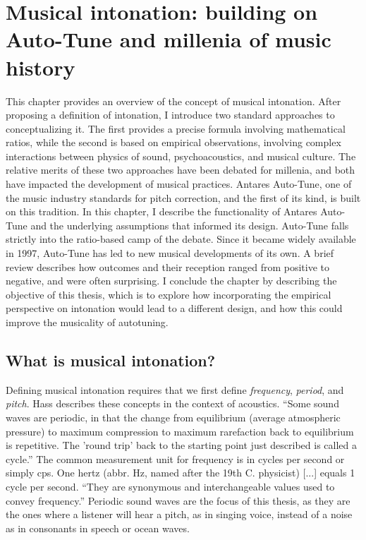 \chapter{Musical intonation: building on Auto-Tune and millenia of music history}
\label{chap:intonation}

This chapter provides an overview of the concept of musical intonation. After proposing a definition of intonation, I introduce two standard approaches to conceptualizing it. The first provides a precise formula involving mathematical ratios, while the second is based on empirical observations, involving complex interactions between physics of sound, psychoacoustics, and musical culture. The relative merits of these two approaches have been debated for millenia, and both have impacted the development of musical practices. Antares Auto-Tune, one of the music industry standards for pitch correction, and the first of its kind, is built on this tradition. In this chapter, I describe the functionality of Antares Auto-Tune and the underlying assumptions that informed its design. Auto-Tune falls strictly into the ratio-based camp of the debate. Since it became widely available in 1997, Auto-Tune has led to new musical developments of its own. A brief review describes how outcomes and their reception ranged from positive to negative, and were often surprising. I conclude the chapter by describing the objective of this thesis, which is to explore how incorporating the empirical perspective on intonation would lead to a different design, and how this could improve the musicality of autotuning. 

\section{What is musical intonation?} 
Defining musical intonation requires that we first define \textit{frequency}, \textit{period}, and \textit{pitch}. Hass describes these concepts in the context of acoustics. ``Some sound waves are periodic, in that the change from equilibrium (average atmospheric pressure) to maximum compression to maximum rarefaction back to equilibrium is repetitive. The 'round trip' back to the starting point just described is called a cycle.'' The common measurement unit for frequency is in cycles per second or simply cps. One hertz (abbr. Hz, named after the 19th C. physicist) [...] equals 1 cycle per second. ``They are synonymous and interchangeable values used to convey frequency.'' \cite[][Ch.~1, Sec.~4--5]{hass2019introduction} Periodic sound waves are the focus of this thesis, as they are the ones where a listener will hear a pitch, as in singing voice, instead of a noise as in consonants in speech or ocean waves. 

